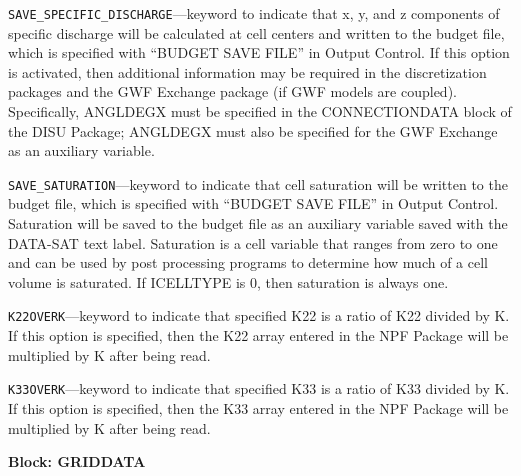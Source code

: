 \begin{description}
\item \texttt{SAVE\_SPECIFIC\_DISCHARGE}---keyword to indicate that x, y, and z components of specific discharge will be calculated at cell centers and written to the budget file, which is specified with ``BUDGET SAVE FILE'' in Output Control.  If this option is activated, then additional information may be required in the discretization packages and the GWF Exchange package (if GWF models are coupled).  Specifically, ANGLDEGX must be specified in the CONNECTIONDATA block of the DISU Package; ANGLDEGX must also be specified for the GWF Exchange as an auxiliary variable.

\item \texttt{SAVE\_SATURATION}---keyword to indicate that cell saturation will be written to the budget file, which is specified with ``BUDGET SAVE FILE'' in Output Control.  Saturation will be saved to the budget file as an auxiliary variable saved with the DATA-SAT text label.  Saturation is a cell variable that ranges from zero to one and can be used by post processing programs to determine how much of a cell volume is saturated.  If ICELLTYPE is 0, then saturation is always one.

\item \texttt{K22OVERK}---keyword to indicate that specified K22 is a ratio of K22 divided by K.  If this option is specified, then the K22 array entered in the NPF Package will be multiplied by K after being read.

\item \texttt{K33OVERK}---keyword to indicate that specified K33 is a ratio of K33 divided by K.  If this option is specified, then the K33 array entered in the NPF Package will be multiplied by K after being read.

\end{description}
\item \textbf{Block: GRIDDATA}

